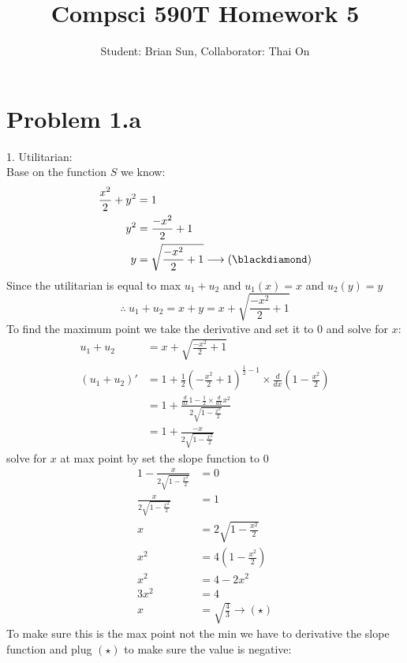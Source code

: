 \documentclass{article}
\title{Compsci 590T Homework 5}
\author{Student: Brian Sun, Collaborator: Thai On}
\date{}
\begin{document}
\maketitle


\section{Problem 1.a}
1. Utilitarian:\\
Base on the function $S$ we know:
\begin{align*}
\frac{x^2}{2} + y^2 &= 1\\
y^2 &= \frac{-x^2}{2} + 1\\
y &= \sqrt{\frac{-x^2}{2} + 1} \longrightarrow (\blackdiamond)
\end{align*}
Since the utilitarian is equal to max $u_1 + u_2$ and $u_1(x) = x$ and $u_2(y) = y$\\
$$\therefore \ u_1 + u_2 = x + y = x + \sqrt{\frac{-x^2}{2} + 1}$$
To find the maximum point we take the derivative and set it to $0$ and solve for $x$:
\begin{align*}
u_1 + u_2 &=x + \sqrt{\frac{-x^2}{2} + 1}\\
(u_1 + u_2)' &= 1 + \frac{1}{2}(-\frac{x^2}{2} + 1)^{\frac{1}{2} - 1} \times \frac{d}{dx}\left(1 - \frac{x^2}{2}\right)\\
&=1 + \frac{\frac{d}{dx}1 - \frac{1}{2} \times \frac{d}{dx}x^2}{2\sqrt{1 - \frac{x^2}{2}}}\\
&= 1 + \frac{-x}{2\sqrt{1 - \frac{x^2}{2}}}
\end{align*}
solve for $x$ at max point by set the slope function to $0$
\begin{align*}
1 - \frac{x}{2\sqrt{1 - \frac{x^2}{2}}} &= 0\\
\frac{x}{2\sqrt{1 - \frac{x^2}{2}}} &= 1\\
x &= 2\sqrt{1 - \frac{x^2}{2}}\\
x^2 &= 4(1 - \frac{x^2}{2})\\
x^2 &= 4 - 2x^2\\
3x^2 &= 4\\
x &= \sqrt{\frac{4}{3}} \longrightarrow (\star)
\end{align*}
To make sure this is the max point not the min we have to derivative the slope function and plug $(\star)$ to make sure the value is negative:
\end{document}
